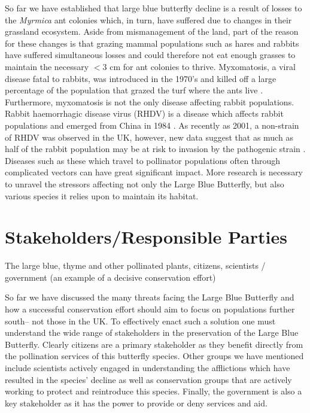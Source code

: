 \documentclass[12pt, twocolumn, letterpaper]{article}
\begin{document}
 So far we have established that large blue butterfly decline is a result of losses to the \textit{Myrmica} ant colonies which, in turn, have suffered due to changes in their grassland ecosystem. Aside from mismanagement of the land, part of the reason for these changes is that grazing mammal populations such as hares and rabbits have suffered simultaneous losses and could therefore not eat enough grasses to maintain the necessary $<3$ cm for ant colonies to thrive. Myxomatosis, a viral disease fatal to rabbits, was introduced in the 1970's and killed off a large percentage of the population that grazed the turf where the ants live \cite{noauthor_how_2009}. Furthermore, myxomatosis is not the only disease affecting rabbit populations. Rabbit haemorrhagic disease virus (RHDV) is a disease which affects rabbit populations and emerged from China in 1984 \cite{noauthor_emergence_nodate}. As recently as 2001, a non-strain of RHDV was observed in the UK, however, new data suggest that as much as half of the rabbit population may be at risk to invasion by the pathogenic strain \cite{noauthor_emergence_nodate}. Diseases such as these which travel to pollinator populations often through complicated vectors can have great significant impact. More research is necessary to unravel the stressors affecting not only the Large Blue Butterfly, but also various species it relies upon to maintain its habitat. 
 

\section*{Stakeholders/Responsible Parties}
The large blue, 
thyme and other pollinated plants, 
citizens, 
scientists / government (an example of a decisive conservation effort) 

So far we have discussed the many threats facing the Large Blue Butterfly and how a successful conservation effort should aim to focus on populations further south-- not those in the UK. To effectively enact such a solution one must understand the wide range of stakeholders in the preservation of the Large Blue Butterfly. Clearly citizens are a primary stakeholder as they benefit directly from the pollination services of this butterfly species. Other groups we have mentioned include scientists actively engaged in understanding the afflictions which have resulted in the species' decline as well as conservation groups that are actively working to protect and reintroduce this species. Finally, the government is also a key stakeholder as it has the power to provide or deny services and aid. 
\end{document}
